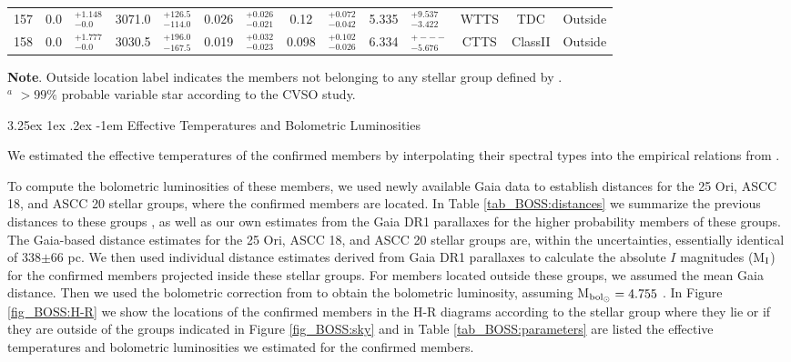 \documentclass[12pt]{article}
\makeatletter
\renewcommand\paragraph{\@startsection{paragraph}{5}{\z@}%
  {3.25ex \@plus1ex \@minus.2ex}%
  {-1em}%
  {\normalfont\normalsize\bfseries}}
\makeatother
\begin{document}
\begin{table}
\begin{threeparttable}
\begin{tabular}{lclclclclclccc}
 	157         & 0.0   & $^{+1.148}_{-0.0  }$ & 3071.0 & $^{+126.5 }_{-114.0}$ & 0.026 & $^{+0.026 }_{-0.021}$ & 0.12  & $^{+0.072 }_{-0.042}$ & 5.335  & $^{+9.537  }_{-3.422}$  & WTTS & TDC      & Outside       \\
 	158         & 0.0   & $^{+1.777}_{-0.0  }$ & 3030.5 & $^{+196.0 }_{-167.5}$ & 0.019 & $^{+0.032 }_{-0.023}$ & 0.098 & $^{+0.102 }_{-0.026}$ & 6.334  & $^{+---    }_{-5.676}$  & CTTS & ClassII  & Outside       \\
	\bottomrule
	\end{tabular}
	\begin{tablenotes}
	  {\bf Note}. Outside location label indicates the members not belonging to any stellar group defined by \citet{Kharchenko2013}.\\
      $^a$ $>99\%$ probable variable star according to the CVSO study.\\
	\end{tablenotes}
 \end{threeparttable}
\end{table}

\paragraph{Effective Temperatures and Bolometric Luminosities\\}
\label{sec_BOSS:HR}

We estimated the effective temperatures of the confirmed members by interpolating their spectral types into the empirical relations from \citet{Luhman1999}.

To compute the bolometric luminosities of these members, we used newly available Gaia data \citep[\ac{Gaia DR1}; ][]{GaiaCollaboration2016} to establish distances for the 25 Ori, ASCC 18, and ASCC 20 stellar groups, where the confirmed members are located. In Table \ref{tab_BOSS:distances} we summarize the previous distances to these groups \citep{Kharchenko2005,Briceno2005,Briceno2007,Kharchenko2013,Downes2014}, as well as our own estimates from the Gaia DR1 parallaxes for the higher probability \citet{Kharchenko2005} members of these groups. The Gaia-based distance estimates for the 25 Ori, ASCC 18, and ASCC 20 stellar groups are, within the uncertainties, essentially identical of 338$\pm$66 pc. We then used individual distance estimates derived from Gaia DR1 parallaxes to calculate the absolute $I$ magnitudes (M$_\textrm{\scriptsize {I}}$) for the confirmed members projected inside these stellar groups. For members located outside these groups, we assumed the mean Gaia distance. Then we used the bolometric correction from \citet{Kenyon-Hartmann1995} to obtain the bolometric luminosity, assuming M$_{\textrm{\scriptsize{bol}}_\odot}=4.755$ \citep{Mamajek2012}. In Figure \ref{fig_BOSS:H-R} we show the locations of the confirmed members in the H-R diagrams according to the stellar group where they lie or if they are outside of the groups indicated in Figure \ref{fig_BOSS:sky} and in Table \ref{tab_BOSS:parameters} are listed the effective temperatures and bolometric luminosities we estimated for the confirmed members.
\end{document}
